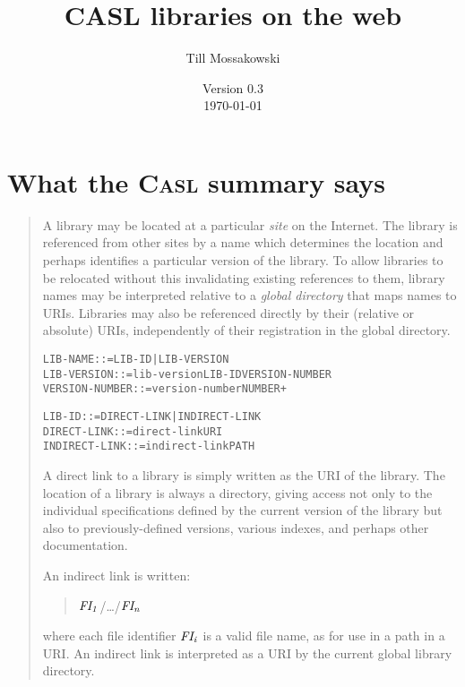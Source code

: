 \documentclass{article}
\renewcommand{\index}[1]{}
\newcommand{\QUERY}[1]
{\marginpar{\raggedright\hspace{0pt}\small #1\\~}}
\newenvironment{Grammar}
 {\small%
  \begin{alltt}}{\end{alltt}\ignorespacesafterend}
\newenvironment{AbstractGrammar}
 {\par\smallskip\samepage\begin{Grammar}}{\end{Grammar}\noindent
 \ignorespacesafterend}
\newenvironment{ConcreteDisplay}
 {\nopagebreak\begin{quote}\casl}{\end{quote}\noindent
 \ignorespacesafterend}
\newcommand{\Metasub}[2]{\mbox{$\it#1_{#2}$}}
\newcommand{\textbothindex}[2]{#1 #2\index{#1!#2}\index{#2!#1}}
\newcommand{\emphindex}[1]{\emph{#1}\index{#1}}
\newcommand{\gramindex}[1]{\texttt{#1}}
\newcommand{\CASL}{\textmd{\textsc{Casl}}\xspace }
\begin{document}
\title{CASL libraries on the web}
\author{Till Mossakowski}
\date{Version 0.3\\[1ex] \today}

\maketitle

\section{What the \CASL summary says}

\begin{quote}
A library may be located at a particular \emphindex{site} on the
Internet.  
The library is referenced from other sites by a name which determines
the location and perhaps identifies a particular version of the
library.  To allow libraries to be relocated without this invalidating
existing references to them, library names may be interpreted relative
to a \emph{\textbothindex{global}{directory}} that maps names to URIs.  
\QUERY{CASL/Summary 9, \ldots:\\
URL changed to URI.}
Libraries
may also be referenced directly by their (relative or absolute) URIs,
independently of their registration in the global directory.

\begin{AbstractGrammar}
\gramindex{LIB-NAME}       ::= LIB-ID | LIB-VERSION
\gramindex{LIB-VERSION}    ::= lib-version LIB-ID VERSION-NUMBER
\gramindex{VERSION-NUMBER} ::= version-number NUMBER+
\end{AbstractGrammar}

\begin{AbstractGrammar}
\gramindex{LIB-ID}        ::= DIRECT-LINK | INDIRECT-LINK
\gramindex{DIRECT-LINK}   ::= direct-link URI
\gramindex{INDIRECT-LINK} ::= indirect-link PATH
\end{AbstractGrammar}
A direct link to a library is simply written as the URI of the
library.  The location of a library is always a directory, giving
access not only to the individual specifications defined by the
current version of the library but also to previously-defined
versions, various indexes, and perhaps other documentation.

An indirect link is written:
\begin{ConcreteDisplay}
\Metasub{FI}{1}/\ldots/\Metasub{FI}{n}
\end{ConcreteDisplay}
where each file identifier \Metasub{FI}{i} is a valid file name, as
for use in a path in a URI.  An indirect link is interpreted as a URI
by the current global library directory.



\end{quote}
\end{document}
